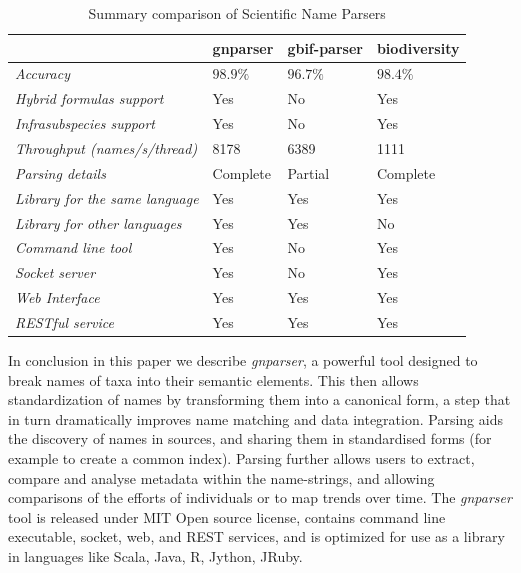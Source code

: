 \documentclass{bmcart}
\begin{document}
\begin{table}[htb]
  \begin{center}
    \caption{Summary comparison of Scientific Name Parsers}
    \label{table:summary}
    \resizebox{12.5cm}{!} {\begin{tabular}{|l|*{3}{l}|}
      \hline
                             & gnparser & gbif-parser & biodiversity \\
      \hline
      \textit{Accuracy}                     & $98.9\%$ & $96.7\%$ & $98.4\%$\\
      \textit{Hybrid formulas support}      & Yes      & No       & Yes     \\
      \textit{Infrasubspecies support}      & Yes      & No       & Yes     \\
      \textit{Throughput (names/s/thread)}  & 8178     & 6389     & 1111    \\
      \textit{Parsing details}              & Complete & Partial  & Complete\\
      \textit{Library for the same language}& Yes      & Yes      & Yes     \\
      \textit{Library for other languages}  & Yes      & Yes      & No      \\
      \textit{Command line tool}            & Yes      & No       & Yes     \\
      \textit{Socket server}                & Yes      & No       & Yes     \\
      \textit{Web Interface}                & Yes      & Yes      & Yes     \\
      \textit{RESTful service}              & Yes      & Yes      & Yes     \\
      \hline
    \end{tabular}
  }
  \end{center}
\end{table}




In conclusion in this paper we describe \textit{gnparser}, a powerful tool designed to break names of taxa into their semantic elements. This then allows standardization of names by transforming them into a canonical form, a step that in turn dramatically improves name matching and data integration. Parsing aids the discovery of names in sources, and sharing them in standardised forms (for example to create a common index). Parsing further allows users to extract, compare and analyse metadata within the name-strings, and allowing comparisons of the efforts of individuals or to map trends over time. The \textit{gnparser} tool is released under MIT Open source license, contains command line executable, socket, web, and REST services, and is optimized for use as a library in languages like Scala, Java, R, Jython, JRuby.
\end{document}
